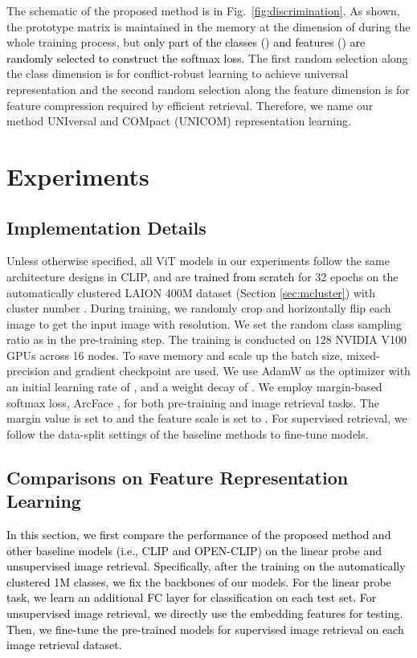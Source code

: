 \documentclass{article} \usepackage{iclr2023_conference,times}
\def\laion{LAION 400M dataset}
\begin{document}
The schematic of the proposed method is in Fig.~\ref{fig:discrimination}.
As shown, the prototype matrix  is maintained in the memory at the dimension of  during the whole training process, but \textcolor{black}{only part of the classes () and features () are randomly selected to construct the softmax loss}. 
The first random selection along the class dimension is for conflict-robust learning to achieve universal representation and the second random selection along the feature dimension is for feature compression required by efficient retrieval. Therefore, we name our method UNIversal and COMpact (UNICOM) representation learning.


\section{Experiments}
\subsection{Implementation Details}
Unless otherwise specified, all ViT models in our experiments follow the same architecture designs in CLIP, and are \textcolor{black}{trained from scratch} for 32 epochs on the automatically clustered \laion{} (Section \ref{sec:mcluster}) with cluster number .
During training, we randomly crop and horizontally flip each image to get the input image with  resolution. 
We set the random class sampling ratio  as  in the pre-training step.
The training is conducted on 128 NVIDIA V100 GPUs across 16 nodes. 
To save memory and scale up the batch size, mixed-precision and gradient checkpoint are used. We use AdamW \citep{loshchilov2018decoupled} as the optimizer with an initial learning rate of , and a weight decay of .
We employ margin-based softmax loss, ArcFace \citep{deng2019arcface,deng2020sub}, for both pre-training and image retrieval tasks. 
The margin value is set to  and the feature scale is set to .
For supervised retrieval, we follow the data-split settings of the baseline methods \citep{Patel2022CVPR,Ermolov_2022_CVPR} to fine-tune models.

\subsection{Comparisons on Feature Representation Learning}
\textcolor{black}{In this section, we first compare the performance of the proposed method and other baseline models (i.e., CLIP and OPEN-CLIP) on the linear probe and unsupervised image retrieval. Specifically, after the training on the automatically clustered 1M classes, we fix the backbones of our models. For the linear probe task, we learn an additional FC layer for classification on each test set. For unsupervised image retrieval, we directly use the embedding features for testing. Then, we fine-tune the pre-trained models for supervised image retrieval on each image retrieval dataset.}
\end{document}
